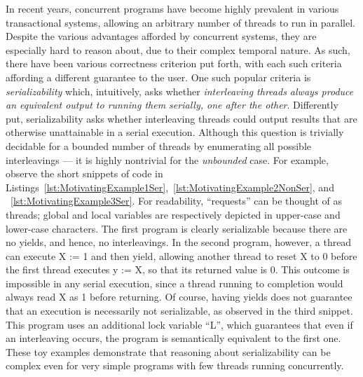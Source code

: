 In recent years, concurrent programs have become highly prevalent in various transactional systems, allowing an arbitrary number of threads to run in parallel.
Despite the various advantages afforded by concurrent systems, they are especially hard to reason about, due to their complex temporal nature.
%
As such, there have been various correctness criterion put forth, with each such criteria affording a different guarantee to the user.
One such popular criteria is \textit{serializability} which, intuitively, asks whether \textit{interleaving threads always produce an equivalent output to running them serially, one after the other}. Differently put, serializability asks whether interleaving threads could output results that are otherwise unattainable in a serial execution.
%
Although this question is trivially decidable for a bounded number of threads by enumerating all possible interleavings --- it is highly nontrivial for the \textit{unbounded} case. For example, observe the short snippets of code in Listings~\ref{lst:MotivatingExample1Ser},~\ref{lst:MotivatingExample2NonSer}, and ~\ref{lst:MotivatingExample3Ser}. For readability, ``requests'' can be thought of as threads; global and local variables are respectively depicted in upper-case and lower-case characters.
%
The first program is clearly serializable because there are no yields, and hence, no interleavings. In the second program, however, a thread can execute X := 1 and then yield, allowing another thread to reset X to 0 before the first thread executes y := X, so that its returned value is 0. This outcome is impossible in any serial execution, since a thread running to completion would always read X as 1 before returning.
Of course, having yields does not guarantee that an execution is necessarily not serializable, as observed in the third snippet. This program uses an additional lock variable ``L'', which guarantees that even if an interleaving occurs, the program is semantically equivalent to the first one.
%
These toy examples demonstrate that reasoning about serializability can be complex even for very simple programs with few threads running concurrently.
%


